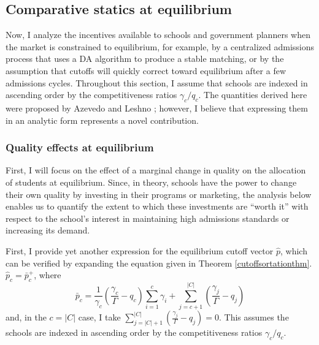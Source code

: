 \documentclass[12pt]{article}
\theoremstyle{definition}
\begin{document}
\subsection{Comparative statics at equilibrium} \label{compstateq}
Now, I analyze the incentives available to schools and government planners when the market is constrained to equilibrium, for example, by a centralized admissions process that uses a DA algorithm to produce a stable matching, or by the assumption that cutoffs will quickly correct toward equilibrium after a few admissions cycles. Throughout this section, I assume that schools are indexed in ascending order by the competitiveness ratios $\gamma_c / q_c$. The quantities derived here were proposed by Azevedo and Leshno \parencite*{supplydemandfw}; however, I believe that expressing them in an analytic form represents a novel contribution. 

\subsubsection{Quality effects at equilibrium} \label{qualityeffectsateq}
First, I will focus on the effect of a marginal change in quality on the allocation of students at equilibrium. Since, in theory, schools have the power to change their own quality by investing in their programs or marketing, the analysis below enables us to quantify the extent to which these investments are ``worth it'' with respect to the school's interest in maintaining high admissions standards or increasing its demand. 

First, I provide yet another expression for the equilibrium cutoff vector $\hat p$, which can be verified by expanding the equation given in Theorem \ref{cutoffsortationthm}. $\hat p_c = \bar p_c^+$, where
\begin{equation} \label{yetanothereqcutoff}
\bar p_c = 
\frac{1}{\gamma_c} \left(\frac{\gamma_c}{\Gamma} - q_c\right) \sum_{i=1}^{c} \gamma_i 
+ \sum_{j=c+1}^{|C|} \left( \frac{\gamma_j}{\Gamma} - q_j \right)
\end{equation}
and, in the $c = |C|$ case, I take $\sum_{j=|C|+1}^{|C|} \left( \frac{\gamma_j}{\Gamma} - q_j \right)= 0$. This assumes the schools are indexed in ascending order by the competitiveness ratios $\gamma_c / q_c$. 
\end{document}
